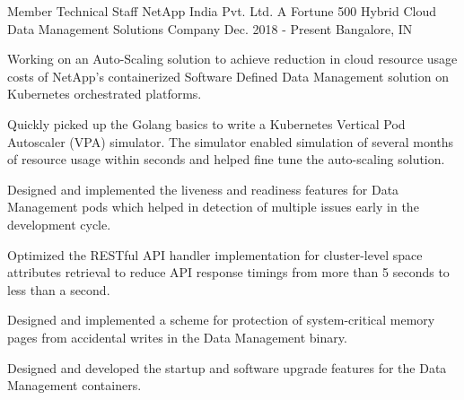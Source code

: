 

\begin{cventries}

  \expentry
    {Member Technical Staff} %
    {NetApp} {India Pvt. Ltd.} %
    {A Fortune 500 Hybrid Cloud Data Management Solutions Company} %
    {Dec. 2018 - Present} %
    {Bangalore, IN} %
    {
      \begin{cvitems} %
        \item {Working on an Auto-Scaling solution to achieve reduction in cloud resource usage costs of NetApp's containerized Software Defined Data Management solution on Kubernetes orchestrated platforms.}
        \item {Quickly picked up the Golang basics to write a Kubernetes Vertical Pod Autoscaler (VPA) simulator. The simulator enabled simulation of several months of resource usage within seconds and helped fine tune the auto-scaling solution.}
        \item {Designed and implemented the liveness and readiness features for Data Management pods which helped in detection of multiple issues early in the development cycle.}
        \item {Optimized the RESTful API handler implementation for cluster-level space attributes retrieval to reduce API response timings from more than 5 seconds to less than a second.}
        \item {Designed and implemented a scheme for protection of system-critical memory pages from accidental writes in the Data Management binary.}
        \item {Designed and developed the startup and software upgrade features for the Data Management containers.}
      \end{cvitems}
    }


\end{cventries}
